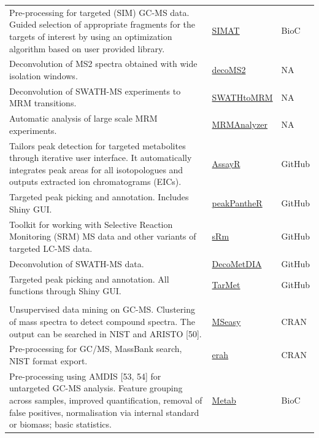 \documentclass[]{article}
\begin{document}
\begin{longtable}[t]{>{\raggedright\arraybackslash}p{30em}>{\raggedright\arraybackslash}p{10em}>{\raggedright\arraybackslash}p{3em}}
Pre-processing for targeted (SIM) GC-MS data. Guided selection of appropriate fragments for the targets of interest by using an optimization algorithm based on user provided library. & \href{https://doi.org/doi:10.18129/B9.bioc.SIMAT}{SIMAT} & BioC\\
\rowcolor{gray!6}  Deconvolution of MS2 spectra obtained with wide isolation windows. & \href{http://pattilab.wustl.edu/software/decoms2/decoms2.php}{decoMS2} & NA\\
Deconvolution of SWATH-MS experiments to MRM transitions. & \href{http://www.metabolomics-shanghai.org/softwaredetail.php?id=128}{SWATHtoMRM} & NA\\
\rowcolor{gray!6}  Automatic analysis of large scale MRM experiments. & \href{http://www.metabolomics-shanghai.org/softwaredetail.php?id=34}{MRMAnalyzer} & NA\\
Tailors peak detection for targeted metabolites through iterative user interface. It automatically integrates peak areas for all isotopologues and outputs extracted ion chromatograms (EICs). & \href{https://github.com/stevehoang/assayr}{AssayR} & GitHub\\
\rowcolor{gray!6}  Targeted peak picking and annotation. Includes Shiny GUI. & \href{https://github.com/phenomecentre/peakPantheR}{peakPantheR} & GitHub\\
Toolkit for working with Selective Reaction Monitoring (SRM) MS data and other variants of targeted LC-MS data. & \href{https://github.com/wilsontom/sRm}{sRm} & GitHub\\
\rowcolor{gray!6}  Deconvolution of SWATH-MS data. & \href{https://github.com/ZhuMSLab/DecoMetDIA}{DecoMetDIA} & GitHub\\
Targeted peak picking and annotation. All functions through Shiny GUI. & \href{https://github.com/hcji/TarMet}{TarMet} & GitHub\\
\rowcolor{gray!6}  \addlinespace[0.3em]
\multicolumn{3}{l}{\textbf{GC-MS and GC×GC-MS}}\\
Unsupervised data mining on GC-MS. Clustering of mass spectra to detect compound spectra. The output can be searched in NIST and ARISTO [50]. & \href{https://cran.r-project.org/package=MSeasy}{MSeasy} & CRAN\\
Pre-processing for GC/MS, MassBank search, NIST format export. & \href{https://cran.r-project.org/package=erah}{erah} & CRAN\\
\rowcolor{gray!6}  Pre-processing using AMDIS [53, 54] for untargeted GC-MS analysis. Feature grouping across samples, improved quantification, removal of false positives, normalisation via internal standard or biomass; basic statistics. & \href{https://doi.org/doi:10.18129/B9.bioc.Metab}{Metab} & BioC\\

\end{longtable}
\end{document}
